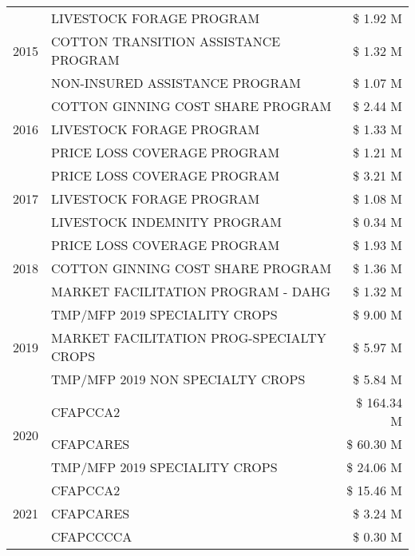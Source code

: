 \begin{tabular}{llr}
\cline{1-3}
\multirow[t]{3}{*}{2015} & LIVESTOCK FORAGE PROGRAM & \$ 1.92 M \\
 & COTTON TRANSITION ASSISTANCE PROGRAM & \$ 1.32 M \\
 & NON-INSURED ASSISTANCE PROGRAM & \$ 1.07 M \\
\cline{1-3}
\multirow[t]{3}{*}{2016} & COTTON GINNING COST SHARE PROGRAM             & \$ 2.44 M \\
 & LIVESTOCK FORAGE PROGRAM                      & \$ 1.33 M \\
 & PRICE LOSS COVERAGE PROGRAM                   & \$ 1.21 M \\
\cline{1-3}
\multirow[t]{3}{*}{2017} & PRICE LOSS COVERAGE PROGRAM & \$ 3.21 M \\
 & LIVESTOCK FORAGE PROGRAM & \$ 1.08 M \\
 & LIVESTOCK INDEMNITY PROGRAM & \$ 0.34 M \\
\cline{1-3}
\multirow[t]{3}{*}{2018} & PRICE LOSS COVERAGE PROGRAM & \$ 1.93 M \\
 & COTTON GINNING COST SHARE PROGRAM & \$ 1.36 M \\
 & MARKET FACILITATION PROGRAM - DAHG & \$ 1.32 M \\
\cline{1-3}
\multirow[t]{3}{*}{2019} & TMP/MFP 2019 SPECIALITY CROPS & \$ 9.00 M \\
 & MARKET FACILITATION PROG-SPECIALTY CROPS & \$ 5.97 M \\
 & TMP/MFP 2019 NON SPECIALTY CROPS & \$ 5.84 M \\
\cline{1-3}
\multirow[t]{3}{*}{2020} & CFAPCCA2 & \$ 164.34 M \\
 & CFAPCARES & \$ 60.30 M \\
 & TMP/MFP 2019 SPECIALITY CROPS & \$ 24.06 M \\
\cline{1-3}
\multirow[t]{3}{*}{2021} & CFAPCCA2 & \$ 15.46 M \\
 & CFAPCARES & \$ 3.24 M \\
 & CFAPCCCCA & \$ 0.30 M \\
\cline{1-3}
\bottomrule
\end{tabular}
